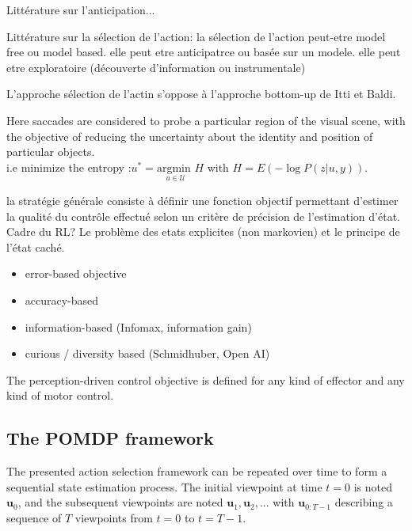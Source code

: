 \documentclass[12pt,twoside,openright]{article}
\begin{document}

{\color{magenta}Littérature sur l'anticipation... 
}


{\color{magenta}Littérature sur la sélection de l'action: la sélection de l'action peut-etre model free ou model based. elle peut etre anticipatrce ou basée sur un modele. elle peut etre exploratoire (découverte d'information ou instrumentale)
	
L'approche sélection de l'actin s'oppose à l'approche bottom-up de Itti et Baldi. 
}


{\color{blue} Here saccades are considered to probe a particular region of the visual scene, with the objective of reducing the uncertainty about the identity and position of particular objects. %
}
	\\
{\color{blue}  {\color{magenta} i.e minimize the entropy :$u^* = \underset{u \in \mathcal{U}}{\text{argmin }} H$ with $H = E(-\log P(z|u,y))$.}
}
	




{\color{magenta} la stratégie générale consiste à définir une fonction objectif permettant d'estimer la qualité du contrôle effectué selon un critère de précision de l'estimation d'état. Cadre du RL? Le problème des etats explicites (non markovien) et le principe de l'état caché.}

{\color{blue} 
	\begin{itemize}
		\item error-based objective
		\item accuracy-based
		\item information-based (Infomax, information gain)
		\item curious / diversity based  (Schmidhuber, Open AI)
	\end{itemize}
	
	
	The perception-driven control objective is defined for any kind of effector and any kind of motor control.} 

\subsection{The POMDP framework}

The presented action selection framework can be repeated over time to form a sequential state estimation process. 
The initial viewpoint at time $t=0$ is noted $\boldsymbol{u}_0$, and the subsequent viewpoints  are noted $\boldsymbol{u}_1, \boldsymbol{u}_2, ...$ with $\boldsymbol{u}_{0:T-1}$ describing a sequence of $T$ viewpoints from $t=0$ to $t=T-1$. %
\end{document}

